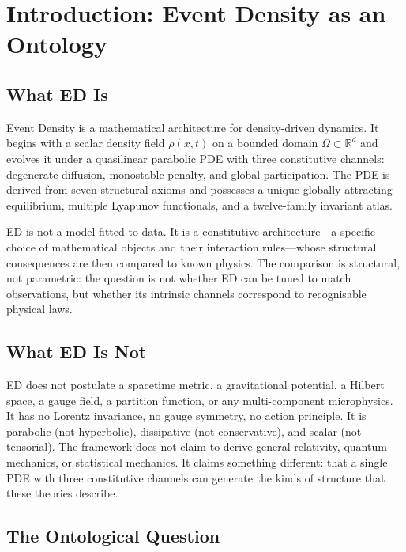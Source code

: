 \documentclass[11pt]{article}
\begin{document}
\section{Introduction: Event Density as an Ontology}

\subsection{What ED Is}

Event Density is a mathematical architecture for density-driven dynamics. It begins with a scalar density field \(\rho(x,t)\) on a bounded domain \(\Omega \subset \mathbb{R}^d\) and evolves it under a quasilinear parabolic PDE with three constitutive channels: degenerate diffusion, monostable penalty, and global participation. The PDE is derived from seven structural axioms and possesses a unique globally attracting equilibrium, multiple Lyapunov functionals, and a twelve-family invariant atlas.

ED is not a model fitted to data. It is a constitutive architecture---a specific choice of mathematical objects and their interaction rules---whose structural consequences are then compared to known physics. The comparison is structural, not parametric: the question is not whether ED can be tuned to match observations, but whether its intrinsic channels correspond to recognisable physical laws.

\subsection{What ED Is Not}

ED does not postulate a spacetime metric, a gravitational potential, a Hilbert space, a gauge field, a partition function, or any multi-component microphysics. It has no Lorentz invariance, no gauge symmetry, no action principle. It is parabolic (not hyperbolic), dissipative (not conservative), and scalar (not tensorial). The framework does not claim to derive general relativity, quantum mechanics, or statistical mechanics. It claims something different: that a single PDE with three constitutive channels can generate the kinds of structure that these theories describe.

\subsection{The Ontological Question}
\end{document}
